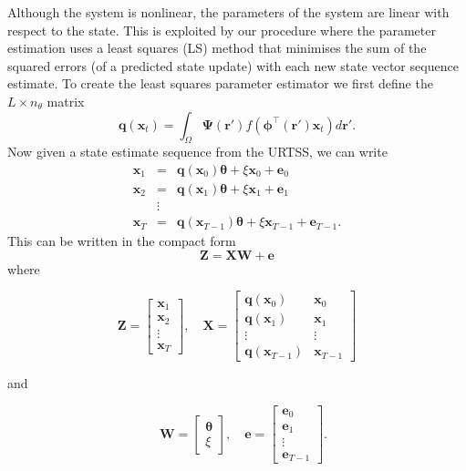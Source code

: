 \documentclass[10pt,a4paper]{article}
\begin{document}
Although the system is nonlinear, the parameters of the system are linear with respect to the state. This is exploited by our procedure where the parameter estimation uses a least squares (LS) method that minimises the sum of the squared errors (of a predicted state update) with each new state vector sequence estimate. To create the least squares parameter estimator we first define the $L \times n_{\theta}$ matrix
\begin{equation}
	\mathbf{q}(\mathbf{x}_t) = \int_\Omega \boldsymbol{\Psi}(\mathbf{r}') f(\boldsymbol{\phi}^{\top}(\mathbf{r}')\mathbf{x}_t) d\mathbf{r}'.
\end{equation}
Now given a state estimate sequence from the URTSS, we can write
\begin{eqnarray*}
	\mathbf x_{1} &=& \mathbf{q}(\mathbf x_0) \boldsymbol{\theta}+\xi\mathbf x_0+\mathbf e_0 \\
	\mathbf x_{2} &=& \mathbf{q}(\mathbf x_1) \boldsymbol{\theta}+\xi\mathbf x_1+\mathbf e_1  \\
	&\vdots& \\
	\mathbf x_{T}&=&\mathbf{q}(\mathbf x_{T-1}) \boldsymbol{\theta}+\xi\mathbf x_{T-1}+\mathbf e_{T-1}. 
\end{eqnarray*}
This can be written in the compact form
\begin{equation}
	\mathbf Z=\mathbf X \mathbf W+\mathbf{e} 
\end{equation}
where
\begin{small}
\begin{equation*}
	\mathbf Z=\left[
	\begin{array}{cccc}
		\mathbf x_{1}\\
		\mathbf x_{2}\\
		\vdots\\
		\mathbf x_{T}
	\end{array}
	\right],\quad \mathbf X=\left[
	\begin{array}{cccc}
		\mathbf q(\mathbf x_0)& \mathbf x_{0}\\
		\mathbf q(\mathbf x_1)& \mathbf x_{1}\\
		\vdots & \vdots\\
		\mathbf q(\mathbf x_{T-1})& \mathbf x_{T-1}
	\end{array}
	\right] 
\end{equation*}
\end{small}
and
\begin{small}
\begin{equation*}
\quad \mathbf W=\left[
	\begin{array}{cc}
		\boldsymbol{\theta} \\
		\xi
	\end{array}
	\right],\quad \mathbf{e}=\left[
	\begin{array}{cccc}
		\mathbf e_0\\
		\mathbf e_1\\
		\vdots\\
		\mathbf e_{T-1}
	\end{array}
	\right].
\end{equation*}
\end{small}
\end{document}
